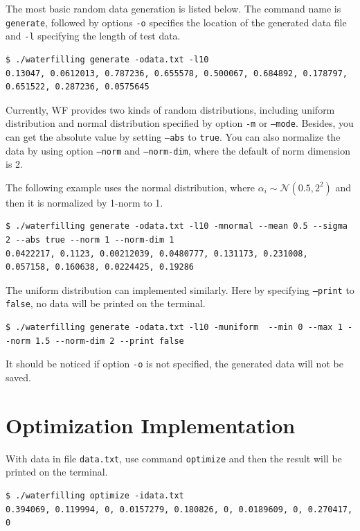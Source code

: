 \documentclass[journal,twoside]{IEEEtran}
\begin{document}
  The most basic random data generation is listed below.
  The command name is \texttt{generate}, followed by options \texttt{-o} specifies the location of the generated data file and \texttt{-l} specifying the length of test data.
  \begin{lstlisting}[morekeywords={\$}]
$ ./waterfilling generate -odata.txt -l10
0.13047, 0.0612013, 0.787236, 0.655578, 0.500067, 0.684892, 0.178797, 0.651522, 0.287236, 0.0575645
  \end{lstlisting}

  Currently, WF provides two kinds of random distributions, including uniform distribution and normal distribution specified by option \texttt{-m} or \texttt{---mode}.
  Besides, you can get the absolute value by setting \texttt{--abs} to \texttt{true}. You can also normalize the data by using option \texttt{---norm} and \texttt{---norm-dim}, where the default of norm dimension is 2.

  The following example uses the normal distribution, where $\alpha_i\sim\mathcal{N}(0.5,2^2)$ and then it is normalized by 1-norm to 1.
  \begin{lstlisting}[morekeywords={\$}]
$ ./waterfilling generate -odata.txt -l10 -mnormal --mean 0.5 --sigma 2 --abs true --norm 1 --norm-dim 1
0.0422217, 0.1123, 0.00212039, 0.0480777, 0.131173, 0.231008, 0.057158, 0.160638, 0.0224425, 0.19286
  \end{lstlisting}
  The uniform distribution can implemented similarly. Here by specifying \texttt{---print} to \texttt{false}, no data will be printed on the terminal.
  \begin{lstlisting}[morekeywords={\$}]
$ ./waterfilling generate -odata.txt -l10 -muniform  --min 0 --max 1 --norm 1.5 --norm-dim 2 --print false
  \end{lstlisting}

  It should be noticed if option \texttt{-o} is not specified, the generated data will not be saved.

  \section{Optimization Implementation}\label{sec:opt}

    With data in file \texttt{data.txt}, use command \texttt{optimize} and then the result will be printed on the terminal.
    \begin{lstlisting}[morekeywords={\$}]
$ ./waterfilling optimize -idata.txt
0.394069, 0.119994, 0, 0.0157279, 0.180826, 0, 0.0189609, 0, 0.270417, 0
    \end{lstlisting}
\end{document}
